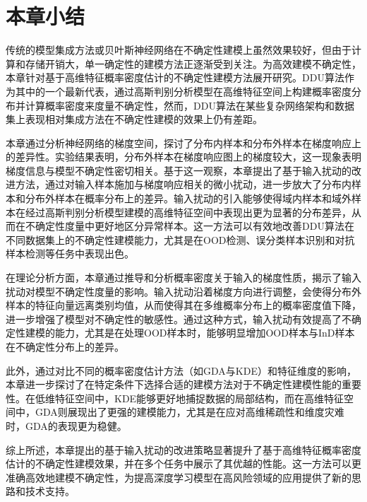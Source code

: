 \section{本章小结}

传统的模型集成方法或贝叶斯神经网络在不确定性建模上虽然效果较好，但由于计算和存储开销大，单一确定性的建模方法正逐渐受到关注。为高效建模不确定性，本章针对基于高维特征概率密度估计的不确定性建模方法展开研究。DDU算法作为其中的一个最新代表，通过高斯判别分析模型在高维特征空间上构建概率密度分布并计算概率密度来度量不确定性，然而，DDU算法在某些复杂网络架构和数据集上表现相对集成方法在不确定性建模的效果上仍有差距。

本章通过分析神经网络的梯度空间，探讨了分布内样本和分布外样本在梯度响应上的差异性。实验结果表明，分布外样本在梯度响应图上的梯度较大，这一现象表明梯度信息与模型不确定性密切相关。基于这一观察，本章提出了基于输入扰动的改进方法，通过对输入样本施加与梯度响应相关的微小扰动，进一步放大了分布内样本和分布外样本在概率分布上的差异。输入扰动的引入能够使得域内样本和域外样本在经过高斯判别分析模型建模的高维特征空间中表现出更为显著的分布差异，从而在不确定性度量中更好地区分异常样本。这一方法可以有效地改善DDU算法在不同数据集上的不确定性建模能力，尤其是在OOD检测、误分类样本识别和对抗样本检测等任务中表现出色。

在理论分析方面，本章通过推导和分析概率密度关于输入的梯度性质，揭示了输入扰动对模型不确定性度量的影响。输入扰动沿着梯度方向进行调整，会使得分布外样本的特征向量远离类别均值，从而使得其在多维概率分布上的概率密度值下降，进一步增强了模型对不确定性的敏感性。通过这种方式，输入扰动有效提高了不确定性建模的能力，尤其是在处理OOD样本时，能够明显增加OOD样本与InD样本在不确定性分布上的差异。

此外，通过对比不同的概率密度估计方法（如GDA与KDE）和特征维度的影响，本章进一步探讨了在特定条件下选择合适的建模方法对于不确定性建模性能的重要性。在低维特征空间中，KDE能够更好地捕捉数据的局部结构，而在高维特征空间中，GDA则展现出了更强的建模能力，尤其是在应对高维稀疏性和维度灾难时，GDA的表现更为稳健。

综上所述，本章提出的基于输入扰动的改进策略显著提升了基于高维特征概率密度估计的不确定性建模效果，并在多个任务中展示了其优越的性能。这一方法可以更准确高效地建模不确定性，为提高深度学习模型在高风险领域的应用提供了新的思路和技术支持。

